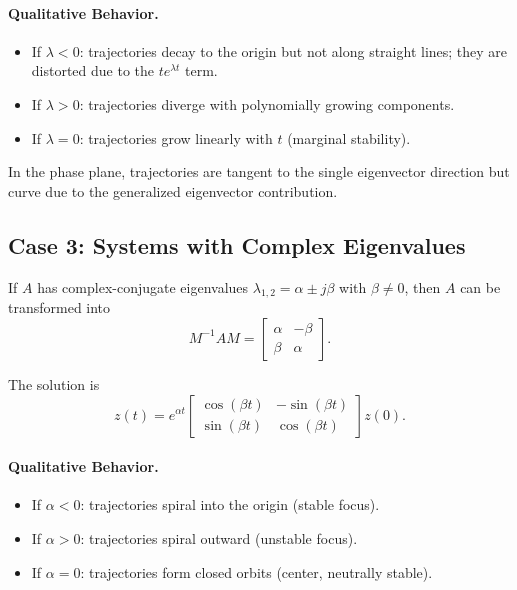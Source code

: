\paragraph{Qualitative Behavior.}
\begin{itemize}
    \item If $\lambda < 0$: trajectories decay to the origin but not along straight lines; they are distorted due to the $t e^{\lambda t}$ term.
    \item If $\lambda > 0$: trajectories diverge with polynomially growing components.
    \item If $\lambda = 0$: trajectories grow linearly with $t$ (marginal stability).
\end{itemize}

In the phase plane, trajectories are tangent to the single eigenvector direction but curve due to the generalized eigenvector contribution.

\subsection{Case 3: Systems with Complex Eigenvalues}

If $A$ has complex-conjugate eigenvalues $\lambda_{1,2} = \alpha \pm j\beta$ with $\beta \neq 0$, then $A$ can be transformed into
\[
M^{-1} A M =
\begin{bmatrix}
\alpha & -\beta \\
\beta & \alpha
\end{bmatrix}.
\]

The solution is
\[
z(t) = e^{\alpha t}
\begin{bmatrix}
\cos(\beta t) & -\sin(\beta t) \\
\sin(\beta t) & \cos(\beta t)
\end{bmatrix} z(0).
\]

\paragraph{Qualitative Behavior.}
\begin{itemize}
    \item If $\alpha < 0$: trajectories spiral into the origin (stable focus).
    \item If $\alpha > 0$: trajectories spiral outward (unstable focus).
    \item If $\alpha = 0$: trajectories form closed orbits (center, neutrally stable).
\end{itemize}

